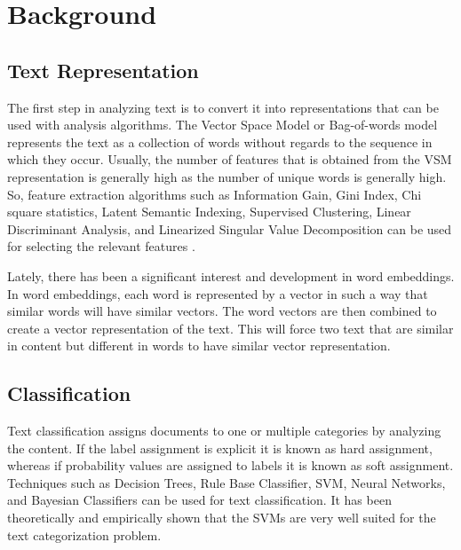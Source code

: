 \chapter{Background} \label{background}

\section{Text Representation}\label{feature}
The first step in analyzing text is to convert it into representations that can be used with analysis algorithms. The Vector Space Model or Bag-of-words model represents the text as a collection of words without regards to the sequence in which they occur. Usually, the number of features that is obtained from the VSM representation is generally high as the number of unique words is generally high. So, feature extraction algorithms such as Information Gain, Gini Index, Chi square statistics, Latent Semantic Indexing, Supervised Clustering, Linear Discriminant Analysis, and Linearized Singular Value Decomposition can be used for selecting the relevant features \cite{aggarwal2012survey}. \par
Lately, there has been a significant interest and development in word embeddings\cite{mikolov2013distributed}\cite{pennington2014glove}\cite{bojanowski2017enriching}. In word embeddings, each word is represented by a vector in such a way that similar words will have similar vectors\cite{goldberg2014word2vec}. The word vectors are then combined to create a vector representation of the text. This will force two text that are similar in content but different in words to have similar vector representation.

\section{Classification}\label{classification}
Text classification assigns documents to one or multiple categories by analyzing the content. If the label assignment is explicit it is known as hard assignment, whereas if probability values are assigned to labels it is known as soft assignment. Techniques such as Decision Trees, Rule Base Classifier, SVM\cite{cortes1995support}, Neural Networks, and Bayesian Classifiers can be used for text classification\cite{aggarwal2012survey}. It has been theoretically and empirically shown that the SVMs are very well suited for the text categorization problem\cite{joachims1998text}.

